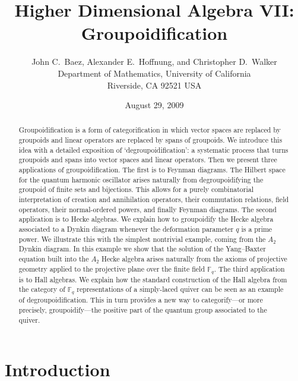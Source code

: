\documentclass{article}
\begin{document}
\title{Higher Dimensional Algebra VII: Groupoidification}
\author{John C.\ Baez, Alexander E.\ Hoffnung, and Christopher D.\ Walker\\
       Department of Mathematics, University of California\\
       Riverside, CA 92521 USA}
\date{August 29, 2009}
\maketitle

\begin{abstract}
\noindent
Groupoidification is a form of categorification in which vector spaces
are replaced by groupoids and linear operators are replaced by spans
of groupoids.  We introduce this idea with a detailed exposition of
`degroupoidification': a systematic process that turns groupoids and
spans into vector spaces and linear operators.  Then we present three
applications of groupoidification.  The first is to Feynman diagrams.
The Hilbert space for the quantum harmonic oscillator arises naturally
from degroupoidifying the groupoid of finite sets and bijections.
This allows for a purely combinatorial interpretation of creation and
annihilation operators, their commutation relations, field operators,
their normal-ordered powers, and finally Feynman diagrams.  The second
application is to Hecke algebras.  We explain how to groupoidify the
Hecke algebra associated to a Dynkin diagram whenever the deformation
parameter $q$ is a prime power.  We illustrate this with the simplest
nontrivial example, coming from the $A_2$ Dynkin diagram.  In this
example we show that the solution of the Yang--Baxter equation built
into the $A_2$ Hecke algebra arises naturally from the axioms of
projective geometry applied to the projective plane over the finite
field $\mathbb{F}_q$.  The third application is to Hall algebras.  We
explain how the standard construction of the Hall algebra from the
category of $\mathbb{F}_q$ representations of a simply-laced quiver
can be seen as an example of degroupoidification.  This in turn
provides a new way to categorify---or more precisely, groupoidify---the 
positive part of the quantum group associated to the quiver.
\end{abstract}

\section{Introduction}\label{intro}
\end{document}
